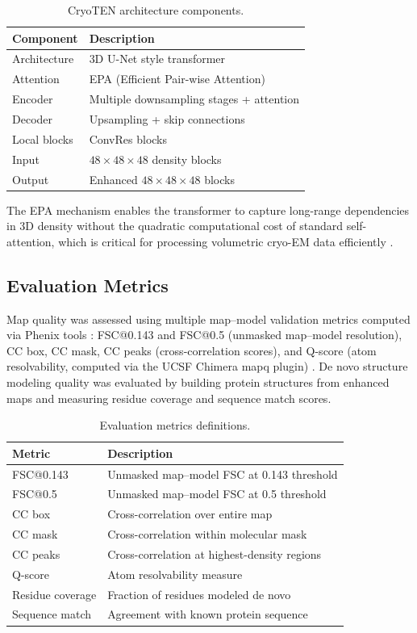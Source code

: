 \documentclass[11pt]{article}
\begin{document}
\begin{table}[H]
\centering
\caption{CryoTEN architecture components.}
\label{tab:architecture}
\begin{tabular}{ll}
\toprule
Component & Description \\
\midrule
Architecture & 3D U-Net style transformer \\
Attention & EPA (Efficient Pair-wise Attention) \\
Encoder & Multiple downsampling stages + attention \\
Decoder & Upsampling + skip connections \\
Local blocks & ConvRes blocks \\
Input & $48 \times 48 \times 48$ density blocks \\
Output & Enhanced $48 \times 48 \times 48$ blocks \\
\bottomrule
\end{tabular}
\end{table}

The EPA mechanism enables the transformer to capture long-range dependencies in 3D density without the quadratic computational cost of standard self-attention, which is critical for processing volumetric cryo-EM data efficiently \citep{Shaker2022}.

\subsection{Evaluation Metrics}

Map quality was assessed using multiple map--model validation metrics computed via Phenix tools \citep{Afonine2018}: FSC@0.143 and FSC@0.5 (unmasked map--model resolution), CC box, CC mask, CC peaks (cross-correlation scores), and Q-score (atom resolvability, computed via the UCSF Chimera mapq plugin) \citep{Pintilie2020}. De novo structure modeling quality was evaluated by building protein structures from enhanced maps and measuring residue coverage and sequence match scores.

\begin{table}[H]
\centering
\caption{Evaluation metrics definitions.}
\label{tab:metrics}
\begin{tabular}{ll}
\toprule
Metric & Description \\
\midrule
FSC@0.143 & Unmasked map--model FSC at 0.143 threshold \\
FSC@0.5 & Unmasked map--model FSC at 0.5 threshold \\
CC box & Cross-correlation over entire map \\
CC mask & Cross-correlation within molecular mask \\
CC peaks & Cross-correlation at highest-density regions \\
Q-score & Atom resolvability measure \\
Residue coverage & Fraction of residues modeled de novo \\
Sequence match & Agreement with known protein sequence \\
\bottomrule
\end{tabular}
\end{table}
\end{document}
